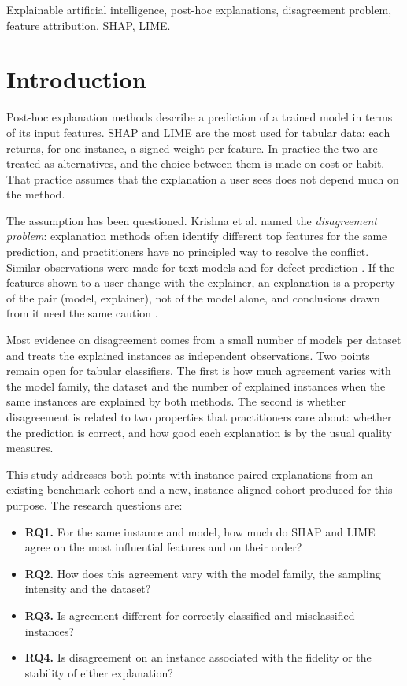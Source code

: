 \documentclass{cys}
\begin{document}
\begin{keywords}
Explainable artificial intelligence, post-hoc explanations, disagreement problem, feature attribution, SHAP, LIME.
\end{keywords}

\section{Introduction}
\label{sec:introduction}

Post-hoc explanation methods describe a prediction of a trained model in terms of its input
features. SHAP \cite{lundberg2017unified} and LIME \cite{ribeiro2016why} are the most used
for tabular data: each returns, for one instance, a signed weight per feature. In practice
the two are treated as alternatives, and the choice between them is made on cost or habit.
That practice assumes that the explanation a user sees does not depend much on the method.

The assumption has been questioned. Krishna et al. \cite{krishna2024disagreement} named
the \emph{disagreement problem}: explanation methods often identify different top
features for the same prediction, and practitioners have no principled way to resolve the
conflict. Similar observations were made for text models \cite{neely2021order} and for
defect prediction \cite{roy2022why}. If the features shown to a user change with the
explainer, an explanation is a property of the pair (model, explainer), not of the model
alone, and conclusions drawn from it need the same caution
\cite{rudin2019stop,doshivelez2017rigorous}.

Most evidence on disagreement comes from a small number of models per dataset and treats
the explained instances as independent observations. Two points remain open for tabular
classifiers. The first is how much agreement varies with the model family, the dataset
and the number of explained instances when the same instances are explained by both
methods. The second is whether disagreement is related to two properties that
practitioners care about: whether the prediction is correct, and how good each
explanation is by the usual quality measures.

This study addresses both points with instance-paired explanations from an existing
benchmark cohort and a new, instance-aligned cohort produced for this purpose. The
research questions are:

\begin{itemize}
\item \textbf{RQ1.} For the same instance and model, how much do SHAP and LIME agree on
the most influential features and on their order?
\item \textbf{RQ2.} How does this agreement vary with the model family, the sampling
intensity and the dataset?
\item \textbf{RQ3.} Is agreement different for correctly classified and misclassified
instances?
\item \textbf{RQ4.} Is disagreement on an instance associated with the fidelity or the
stability of either explanation?
\end{itemize}
\end{document}
